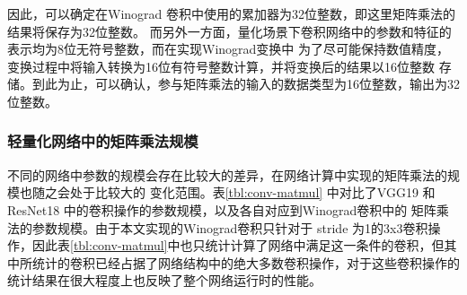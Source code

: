 因此，可以确定在Winograd 卷积中使用的累加器为32位整数，即这里矩阵乘法的结果将保存为32位整数。
而另外一方面，量化场景下卷积网络中的参数和特征的表示均为8位无符号整数，而在实现Winograd变换中
为了尽可能保持数值精度，变换过程中将输入转换为16位有符号整数计算，并将变换后的结果以16位整数
存储。到此为止，可以确认，参与矩阵乘法的输入的数据类型为16位整数，输出为32位整数。

\subsubsection{轻量化网络中的矩阵乘法规模}

不同的网络中参数的规模会存在比较大的差异，在网络计算中实现的矩阵乘法的规模也随之会处于比较大的
变化范围。表\ref{tbl:conv-matmul} 中对比了VGG19 和 ResNet18 中的卷积操作的参数规模，以及各自对应到Winograd卷积中的
矩阵乘法的参数规模。由于本文实现的Winograd卷积只针对于 stride 为1的3x3卷积操作，因此表\ref{tbl:conv-matmul}中也只统计计算了网络中满足这一条件的卷积，但其中所统计的卷积已经占据了网络结构中的绝大多数卷积操作，对于这些卷积操作的统计结果在很大程度上也反映了整个网络运行时的性能。

